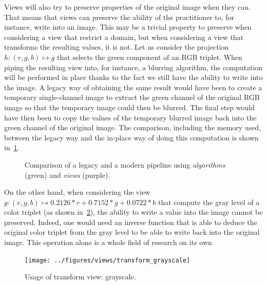 Views will also try to preserve properties of the original image when they can. That means that views can preserve the
ability of the practitioner to, for instance, write into an image. This may be a trivial property to preserve when
considering a view that restrict a domain, but when considering a view that transforms the resulting values, it is not.
Let us consider the projection \(h: (r,g,b) \mapsto g\) that selects the green component of an RGB triplet. When piping
the resulting view into, for instance, a blurring algorithm, the computation will be performed in place thanks to
the fact we still have the ability to write into the image. A legacy way of obtaining the same result would have been to
create a temporary single-channel image to extract the green channel of the original RGB image so that the temporary
image could then be blurred. The final step would have then been to copy the values of the temporary blurred image back
into the green channel of the original image. The comparison, including the memory used, between the legacy way and the
in-place way of doing this computation is shown in~\cref{fig:legacy.vs.view}.

\begin{figure}[htbp]
  \centering
  \hfil

  \caption{Comparison of a legacy and a modern pipeline using \emph{algorithms} (green) and \emph{views} (purple).}
  \label{fig:legacy.vs.view}
\end{figure}

On the other hand, when considering the view \(g: (r,g,b) \mapsto 0.2126*r+0.7152*g+0.0722*b\) that compute the gray
level of a color triplet (as shown in~\cref{fig:view.grayscale}), the ability to write a value into the image cannot be
preserved. Indeed, one would need an inverse function that is able to deduce the original color triplet from the gray
level to be able to write back into the original image. This operation alone is a whole field of research on its
own~\parencite{zhang.2016.colorful,levin.2004.colorization,welsh.2002.transferring}

\begin{figure}[htbp]
  \centering
  \texttt{[image: ../figures/views/transform\_grayscale]}
  \caption{Usage of transform view: grayscale.}
  \label{fig:view.grayscale}
\end{figure}

